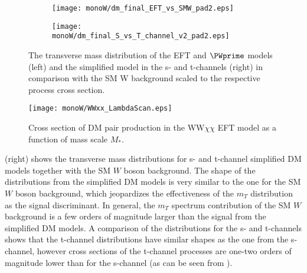 \begin{figure}[]
\begin{subfigure}{.5\textwidth}
  \centering
  \texttt{[image: monoW/dm\_final\_EFT\_vs\_SMW\_pad2.eps]}
\end{subfigure}%
\begin{subfigure}{.5\textwidth}
  \centering
  \texttt{[image: monoW/dm\_final\_S\_vs\_T\_channel\_v2\_pad2.eps]} 
\end{subfigure}
\caption{The transverse mass distribution
of the EFT and $\PWprime$ models (left) and the simplified model in the s- and t-channels (right) in comparison with the SM W background scaled to the respective process cross section.}
  \label{fig:scaledKin}
\end{figure}

\begin{figure}[]
 \texttt{[image: monoW/WWxx\_LambdaScan.eps]}
  \caption{Cross section of DM pair production in the WW$\chi\chi$ EFT model as a function of mass scale $M_{*}$.}
  \label{fig:lambdaScan}
\end{figure}

 (right) shows the transverse mass distributions for s- and t-channel simplified DM models together with the SM $W$ boson background.
The shape of the distributions from the simplified DM models is very similar to the one for the SM $W$ boson background, which jeopardizes the effectiveness of the $m_T$ distribution as the signal discriminant. In general, the $m_T$ spectrum contribution of the SM $W$ background is
a few orders of magnitude larger than the signal from the simplified DM models.
A comparison of the distributions for the s- and t-channels shows that the t-channel distributions
have similar shapes as the one from the s-channel, however cross sections of the t-channel 
processes are one-two orders of magnitude lower than for the s-channel (as can be seen from ).






